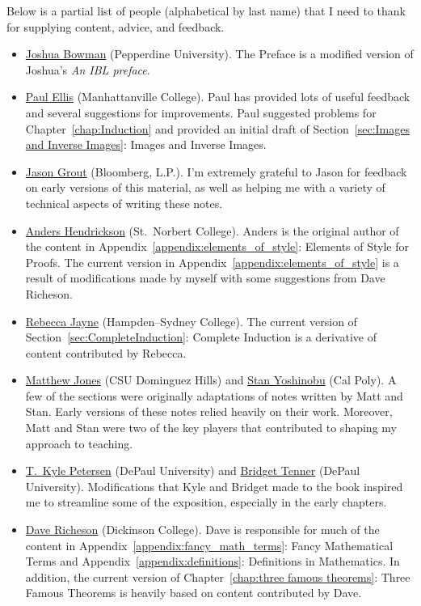 \documentclass[12pt,oneside]{book}
\theoremstyle{definition}
\begin{document}
\noindent Below is a partial list of people (alphabetical by last name) that I need to thank for supplying content, advice, and feedback.
\begin{itemize}
\item \href{https://thalestriangles.blogspot.com}{Joshua Bowman} (Pepperdine University). The Preface is a modified version of Joshua's \emph{An IBL preface}.
\item \href{http://www.paulellis.org}{Paul Ellis} (Manhattanville College). Paul has provided lots of useful feedback and several suggestions for improvements. Paul suggested problems for Chapter~\ref{chap:Induction} and provided an initial draft of Section~\ref{sec:Images and Inverse Images}: Images and Inverse Images.
\item \href{http://jasongrout.org}{Jason Grout} (Bloomberg, L.P.).  I'm extremely grateful to Jason for feedback on early versions of this material, as well as helping me with a variety of technical aspects of writing these notes.
\item \href{http://home.snc.edu/andershendrickson/}{Anders Hendrickson} (St.~Norbert College). Anders is the original author of the content in Appendix~\ref{appendix:elements_of_style}: Elements of Style for Proofs. The current version in Appendix~\ref{appendix:elements_of_style} is a result of modifications made by myself with some suggestions from Dave Richeson.
\item \href{http://www.hsc.edu/rebecca-jayne}{Rebecca Jayne} (Hampden--Sydney College). The current version of Section~\ref{sec:CompleteInduction}: Complete Induction is a derivative of content contributed by Rebecca.
\item \href{http://www4.csudh.edu/library/info/civic-directory/f-j/matthew-g-jones}{Matthew Jones} (CSU Dominguez Hills) and \href{http://www.stanyoshinobu.com}{Stan Yoshinobu} (Cal Poly). A few of the sections were originally adaptations of notes written by Matt and Stan. Early versions of these notes relied heavily on their work. Moreover, Matt and Stan were two of the key players that contributed to shaping my approach to teaching.
\item \href{http://math.depaul.edu/tpeter21/}{T.~Kyle Petersen} (DePaul University) and \href{http://math.depaul.edu/bridget/}{Bridget Tenner} (DePaul University). Modifications that Kyle and Bridget made to the book inspired me to streamline some of the exposition, especially in the early chapters.
\item \href{http://users.dickinson.edu/~richesod/}{Dave Richeson} (Dickinson College). Dave is responsible for much of the content in Appendix~\ref{appendix:fancy_math_terms}: Fancy Mathematical Terms and Appendix~\ref{appendix:definitions}: Definitions in Mathematics. In addition, the current version of Chapter~\ref{chap:three famous theorems}: Three Famous Theorems is heavily based on content contributed by Dave.

\end{itemize}
\end{document}
